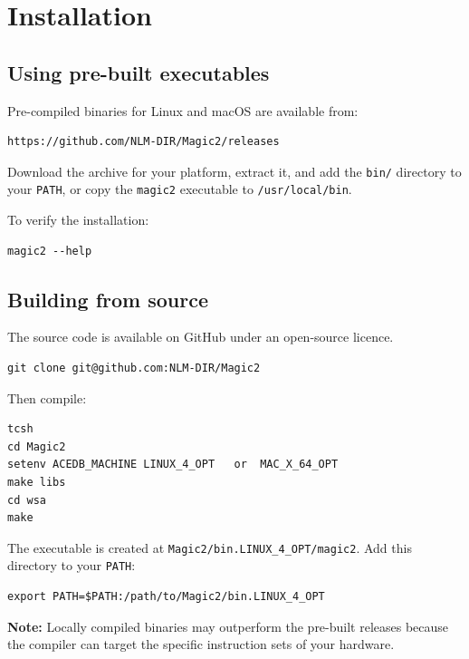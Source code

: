 \documentclass[11pt]{article}
\newcommand{\code}[1]{\texttt{#1}}
\begin{document}
\section{Installation}

\subsection{Using pre-built executables}

Pre-compiled binaries for Linux and macOS are available from:
\begin{lstlisting}
https://github.com/NLM-DIR/Magic2/releases
\end{lstlisting}

Download the archive for your platform, extract it, and add the
\code{bin/} directory to your \code{PATH}, or copy the \code{magic2}
executable to \code{/usr/local/bin}.

To verify the installation:
\begin{lstlisting}
magic2 --help
\end{lstlisting}

\subsection{Building from source}

The source code is available on GitHub under an open-source licence.

\begin{lstlisting}
git clone git@github.com:NLM-DIR/Magic2
\end{lstlisting}

Then compile:
\begin{lstlisting}
tcsh
cd Magic2
setenv ACEDB_MACHINE LINUX_4_OPT   or  MAC_X_64_OPT
make libs
cd wsa
make
\end{lstlisting}

The executable is created at \code{Magic2/bin.LINUX\_4\_OPT/magic2}.
Add this directory to your \code{PATH}:
\begin{lstlisting}
export PATH=$PATH:/path/to/Magic2/bin.LINUX_4_OPT
\end{lstlisting}

\begin{notebox}
\textbf{Note:} Locally compiled binaries may outperform the pre-built
releases because the compiler can target the specific instruction sets
of your hardware.
\end{notebox}
\end{document}
